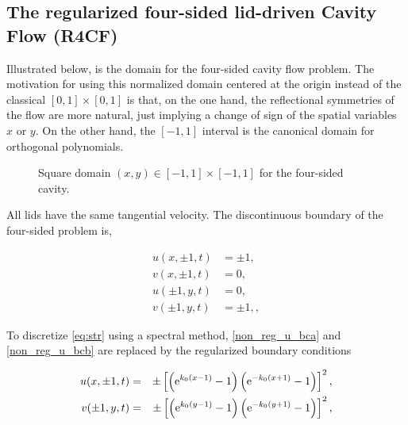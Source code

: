 \clearpage
\subsection{The regularized four-sided lid-driven Cavity Flow (R4CF)} \label{sec:r4sc}

Illustrated below, is the domain for the four-sided cavity flow problem. The
motivation for using this normalized domain centered at the origin instead of
the classical $[0,1]\times[0,1]$ is that, on the one hand, the reflectional
symmetries of the flow are more natural, just implying a change of sign of the
spatial variables $x$ or $y$. On the other hand, the $[-1,1]$ interval is the
canonical domain for orthogonal polynomials. 

\begin{figure}[ht]
\centering
{}
\caption{Square domain $(x,y) \in [-1,1]\times[-1,1]$ for the four-sided cavity.}
\label{fig:cav_4s}
\end{figure}

All lids have the same tangential velocity. The discontinuous boundary of the
four-sided problem is,

\begin{eqnarray}
u(x,\pm 1,t) & = \pm 1,\label{non_reg_u_bca} \\
v(x,\pm 1,t) & = 0, \\
u(\pm 1,y,t) & = 0, \\
v(\pm 1,y,t) & = \pm 1,,\label{non_reg_u_bcb}
\label{non_reg_u_bc}
\end{eqnarray}

To discretize \eqref{eq:str} using a spectral method, \eqref{non_reg_u_bca} and
\eqref{non_reg_u_bcb} are replaced by the regularized boundary conditions

\begin{eqnarray}
u(x,\pm 1,t) & = & \pm\left[\left(\mathrm{e}^{k_0(x - 1)} - 1\right)
  \left(\mathrm{e}^{-k_0(x + 1)} - 1\right)\right]^2,\label{reg_u_bca} \\
v(\pm 1,y,t) & = & \pm\left[\left(\mathrm{e}^{k_0(y - 1)} - 1\right)
  \left(\mathrm{e}^{-k_0(y + 1)} - 1\right)\right]^2,\label{reg_u_bcb}
\end{eqnarray}

